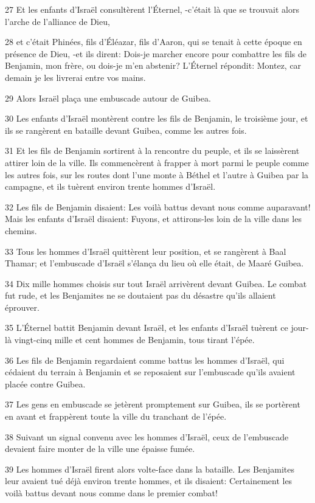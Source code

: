 \par 27 Et les enfants d'Israël consultèrent l'Éternel, -c'était là que se trouvait alors l'arche de l'alliance de Dieu,
\par 28 et c'était Phinées, fils d'Éléazar, fils d'Aaron, qui se tenait à cette époque en présence de Dieu, -et ils dirent: Dois-je marcher encore pour combattre les fils de Benjamin, mon frère, ou dois-je m'en abstenir? L'Éternel répondit: Montez, car demain je les livrerai entre vos mains.
\par 29 Alors Israël plaça une embuscade autour de Guibea.
\par 30 Les enfants d'Israël montèrent contre les fils de Benjamin, le troisième jour, et ils se rangèrent en bataille devant Guibea, comme les autres fois.
\par 31 Et les fils de Benjamin sortirent à la rencontre du peuple, et ils se laissèrent attirer loin de la ville. Ils commencèrent à frapper à mort parmi le peuple comme les autres fois, sur les routes dont l'une monte à Béthel et l'autre à Guibea par la campagne, et ils tuèrent environ trente hommes d'Israël.
\par 32 Les fils de Benjamin disaient: Les voilà battus devant nous comme auparavant! Mais les enfants d'Israël disaient: Fuyons, et attirons-les loin de la ville dans les chemins.
\par 33 Tous les hommes d'Israël quittèrent leur position, et se rangèrent à Baal Thamar; et l'embuscade d'Israël s'élança du lieu où elle était, de Maaré Guibea.
\par 34 Dix mille hommes choisis sur tout Israël arrivèrent devant Guibea. Le combat fut rude, et les Benjamites ne se doutaient pas du désastre qu'ils allaient éprouver.
\par 35 L'Éternel battit Benjamin devant Israël, et les enfants d'Israël tuèrent ce jour-là vingt-cinq mille et cent hommes de Benjamin, tous tirant l'épée.
\par 36 Les fils de Benjamin regardaient comme battus les hommes d'Israël, qui cédaient du terrain à Benjamin et se reposaient sur l'embuscade qu'ils avaient placée contre Guibea.
\par 37 Les gens en embuscade se jetèrent promptement sur Guibea, ils se portèrent en avant et frappèrent toute la ville du tranchant de l'épée.
\par 38 Suivant un signal convenu avec les hommes d'Israël, ceux de l'embuscade devaient faire monter de la ville une épaisse fumée.
\par 39 Les hommes d'Israël firent alors volte-face dans la bataille. Les Benjamites leur avaient tué déjà environ trente hommes, et ils disaient: Certainement les voilà battus devant nous comme dans le premier combat!

